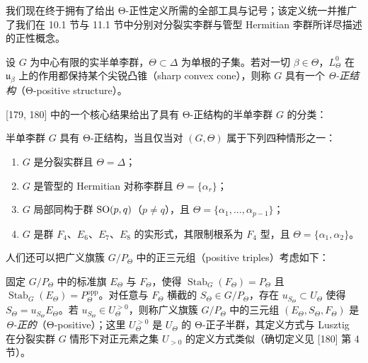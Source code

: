 我们现在终于拥有了给出 Θ-正性定义所需的全部工具与记号；该定义统一并推广了我们在 10.1 节与 11.1 节中分别对分裂实李群与管型 Hermitian 李群所详尽描述的正性概念。

\begin{definition}
设 $G$ 为中心有限的实半单李群，$\Theta\subset\Delta$ 为单根的子集。若对一切 $\beta\in\Theta$，$L_\Theta^0$ 在 $\mathfrak{u}_\beta$ 上的作用都保持某个尖锐凸锥（sharp convex cone），则称 $G$ 具有一个 \emph{Θ-正结构}（Θ-positive structure）。
\end{definition}

[179, 180] 中的一个核心结果给出了具有 Θ-正结构的半单李群 $G$ 的分类：

\begin{theorem}
半单李群 $G$ 具有 Θ-正结构，当且仅当对 $(G,\Theta)$ 属于下列四种情形之一：
\begin{enumerate}
\item $G$ 是分裂实群且 $\Theta=\Delta$；
\item $G$ 是管型的 Hermitian 对称李群且 $\Theta=\{\alpha_r\}$；
\item $G$ 局部同构于群 $\operatorname{SO}(p,q)$（$p\ne q$），且 $\Theta=\{\alpha_1,\dots,\alpha_{p-1}\}$；
\item $G$ 是群 $F_4$、$E_6$、$E_7$、$E_8$ 的实形式，其限制根系为 $F_4$ 型，且 $\Theta=\{\alpha_1,\alpha_2\}$。
\end{enumerate}
\end{theorem}


人们还可以把广义旗簇 $G/P_\Theta$ 中的正三元组（positive triples）考虑如下：

\begin{definition}[12.17]
固定 $G/P_\Theta$ 中的标准旗 $E_\Theta$ 与 $F_\Theta$，使得 $\operatorname{Stab}_G(F_\Theta)=P_\Theta$ 且 $\operatorname{Stab}_G(E_\Theta)=P_\Theta^{\mathrm{opp}}$。对任意与 $F_\Theta$ 横截的 $S_\Theta\in G/P_\Theta$，存在 $u_{S_\Theta}\subset U_\Theta$ 使得 $S_\Theta=u_{S_\Theta}E_\Theta$。若 $u_{S_\Theta}\in U_\Theta^{>0}$，则称广义旗簇 $G/P_\Theta$ 中的三元组 $(E_\Theta,S_\Theta,F_\Theta)$ 是 \emph{Θ-正的}（Θ-positive）；这里 $U_\Theta^{>0}$ 是 $U_\Theta$ 的 Θ-正子半群，其定义方式与 Lusztig 在分裂实群 $G$ 情形下对正元素之集 $U_{>0}$ 的定义方式类似（确切定义见 [180] 第 4 节）。
\end{definition}

